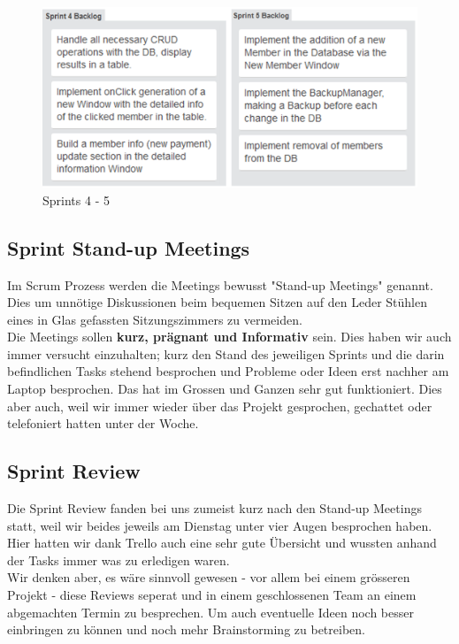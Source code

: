 \documentclass{article}
\begin{document}
\begin{figure}[h]
	\centering
	\includegraphics[width=0.4\paperwidth]{Sprint4-5}
	\caption{Sprints 4 - 5}
\end{figure}

\subsection{Sprint Stand-up Meetings}
Im Scrum Prozess werden die Meetings bewusst "Stand-up Meetings" genannt. Dies um unnötige Diskussionen  beim bequemen Sitzen auf den Leder Stühlen eines in Glas gefassten Sitzungszimmers zu vermeiden.\\
Die Meetings sollen \textbf{kurz, prägnant und Informativ} sein.
Dies haben wir auch immer versucht einzuhalten; kurz den Stand des jeweiligen Sprints und die darin befindlichen Tasks stehend besprochen und Probleme oder Ideen erst nachher am Laptop besprochen.
Das hat im Grossen und Ganzen sehr gut funktioniert. Dies aber auch, weil wir immer wieder über das Projekt gesprochen, gechattet oder telefoniert hatten unter der Woche.

\subsection{Sprint Review}
Die Sprint Review fanden bei uns zumeist kurz nach den Stand-up Meetings statt, weil wir beides jeweils am Dienstag unter vier Augen besprochen haben.
Hier hatten wir dank Trello auch eine sehr gute Übersicht und wussten anhand der Tasks immer was zu erledigen waren.\\
Wir denken aber, es wäre sinnvoll gewesen - vor allem bei einem grösseren Projekt - diese Reviews seperat und in einem geschlossenen Team an einem abgemachten Termin zu besprechen. Um auch eventuelle Ideen noch besser einbringen zu können und noch mehr Brainstorming zu betreiben.
\end{document}
